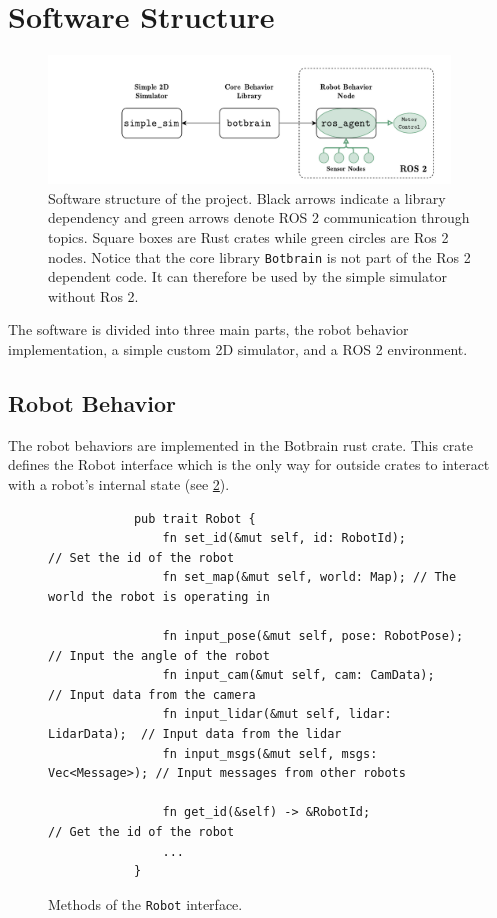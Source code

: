 \section{Software Structure}
\begin{figure}
    \begin{center}
        \includegraphics[width=0.95\textwidth]{figures/software-structure.pdf}
    \end{center}
    \caption{Software structure of the project. Black arrows indicate a library dependency and green arrows denote ROS 2 communication through topics. Square boxes are Rust crates while green circles are Ros 2 nodes. Notice that the core library \texttt{Botbrain} is not part of the Ros 2 dependent code. It can therefore be used by the simple simulator without Ros 2.}\label{fig:}
\end{figure}


The software is divided into three main parts, the robot behavior implementation, a simple custom 2D
simulator, and a ROS 2 environment.

\subsection{Robot Behavior}
The robot behaviors are implemented in the Botbrain rust crate. This crate defines the Robot interface
which is the only way for outside crates to interact with a robot’s internal state (see \cref{fig:robot-interface}).

\begin{figure}[H]
    \begin{center}
        \begin{verbatim}
            pub trait Robot {
                fn set_id(&mut self, id: RobotId);            // Set the id of the robot
                fn set_map(&mut self, world: Map); // The world the robot is operating in

                fn input_pose(&mut self, pose: RobotPose);    // Input the angle of the robot
                fn input_cam(&mut self, cam: CamData);        // Input data from the camera
                fn input_lidar(&mut self, lidar: LidarData);  // Input data from the lidar
                fn input_msgs(&mut self, msgs: Vec<Message>); // Input messages from other robots

                fn get_id(&self) -> &RobotId;                 // Get the id of the robot
                ...
            }
        \end{verbatim}
    \end{center}
    \caption{Methods of the \texttt{Robot} interface.}\label{fig:robot-interface}
\end{figure}

